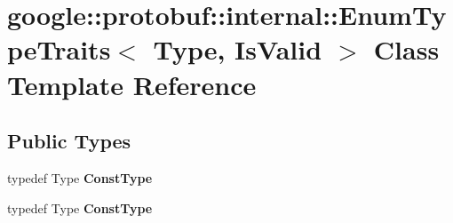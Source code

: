 \hypertarget{classgoogle_1_1protobuf_1_1internal_1_1EnumTypeTraits}{}\section{google\+:\+:protobuf\+:\+:internal\+:\+:Enum\+Type\+Traits$<$ Type, Is\+Valid $>$ Class Template Reference}
\label{classgoogle_1_1protobuf_1_1internal_1_1EnumTypeTraits}
\subsection*{Public Types}
\begin{DoxyCompactItemize}
\item 
\mbox{\label{classgoogle_1_1protobuf_1_1internal_1_1EnumTypeTraits_a74ad1b6cb48e6ec07aa38d40b4cca894}} 
typedef Type {\bfseries Const\+Type}
\item 
\mbox{\label{classgoogle_1_1protobuf_1_1internal_1_1EnumTypeTraits_a74ad1b6cb48e6ec07aa38d40b4cca894}} 
typedef Type {\bfseries Const\+Type}
\end{DoxyCompactItemize}

